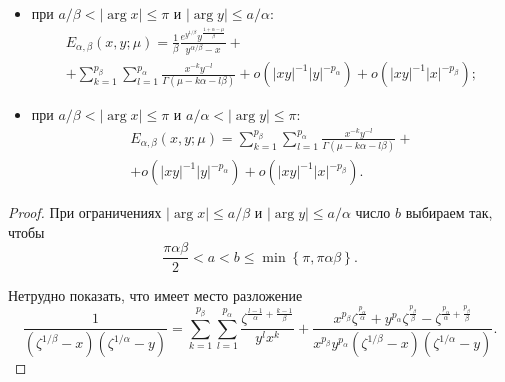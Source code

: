 {\begin{theorem}
\begin{itemize}
\item[\rm3)] при $a/\beta  <|\arg x|\le \pi$ и $\left|\arg y\right|\le a/\alpha {:}$
\begin{multline}
\label{assimptE__21_}
E_{\alpha, \beta }  (x, y; \mu)=\frac{1}{\beta } \frac{e^{y^{1/\beta} } y^{\frac{1+\alpha -\mu }{\beta } } }{y^{\alpha/\beta}  -x} +
\\
+\sum _{k=1}^{p_{\beta } }\sum _{l=1}^{p_{\alpha } }\frac{x^{-k} y^{-l} }{\Gamma (\mu -k\alpha -l\beta)} + o\left(|xy|^{-1}|y|^{-p_\alpha}\right) + o\left(|xy|^{-1}|x|^{-p_\beta}\right);
\end{multline}



\item[\rm 4)] при $a/\beta  <|\arg x|\le \pi $ и $a/\alpha  <\left|\arg y\right|\le \pi {:}$
\begin{multline}
\label{assimptE__22_}
E_{\alpha, \beta }  (x, y; \mu)=\sum _{k=1}^{p_{\beta } }\sum _{l=1}^{p_{\alpha } }\frac{x^{-k} y^{-l} }{\Gamma (\mu -k\alpha -l\beta)}  + \\+ o\left(|xy|^{-1}|y|^{-p_\alpha}\right) + o\left(|xy|^{-1}|x|^{-p_\beta}\right).
\end{multline}

\end{itemize}

\end{theorem}
\begin{proof}
При ограничениях $|\arg x|\le a/\beta  $ и $\left|\arg y\right|\le a/\alpha $ число $b$ выбираем  так, чтобы
\begin{equation}
\label{assimptE__23_}
\frac{\pi \alpha \beta }{2} <a<b\le \min \left\{\pi ,\pi \alpha \beta \right\}.
\end{equation}

Нетрудно показать, что имеет место разложение
\begin{equation}
\label{assimptE__24_}
\frac{1}{\left(\zeta ^{1/\beta} -x\right)\left(\zeta ^{1/ \alpha}  -y\right)} = \sum _{k=1}^{p_{\beta } }\sum _{l=1}^{p_{\alpha } }\frac{\zeta ^{\frac{l-1}{\alpha } +\frac{k-1}{\beta } } }{y^l  x^k  }   +\frac{x^{p_{\beta } } \zeta ^{\frac{p_{\alpha } }{\alpha } } +y^{p_{\alpha } } \zeta ^{\frac{p_{\beta } }{\beta } } -\zeta ^{\frac{p_{\alpha } }{\alpha } +\frac{p_{\beta } }{\beta } } }{x^{p_{\beta } } y^{p_{\alpha } } \left(\zeta ^{1/\beta} -x\right)\left(\zeta ^{1/ \alpha}  -y\right)} .
\end{equation}


\end{proof}}
